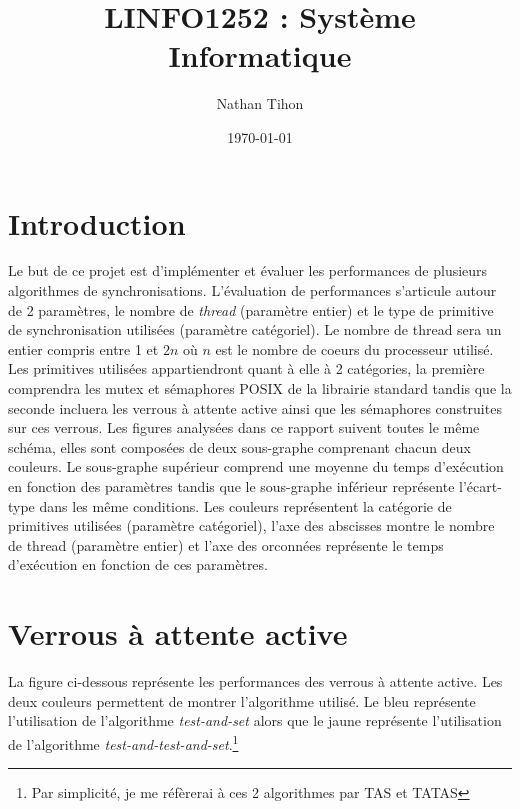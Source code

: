 

\title{LINFO1252 : Système Informatique}
\author{Nathan Tihon}
\date{\today}



\maketitle
\newpage

\section{Introduction}

Le but de ce projet est d'implémenter et évaluer les performances de plusieurs algorithmes de synchronisations.
L'évaluation de performances s'articule autour de 2 paramètres, le nombre de \textit{thread} (paramètre entier) et le type de primitive de synchronisation utilisées (paramètre catégoriel).
Le nombre de thread sera un entier compris entre 1 et $2n$ où $n$ est le nombre de coeurs du processeur utilisé.
Les primitives utilisées appartiendront quant à elle à 2 catégories, la première comprendra les mutex et sémaphores POSIX de la librairie standard tandis que la seconde incluera les verrous à attente active ainsi que les sémaphores construites sur ces verrous.
Les figures analysées dans ce rapport suivent toutes le même schéma, elles sont composées de deux sous-graphe comprenant chacun deux couleurs.
Le sous-graphe supérieur comprend une moyenne du temps d'exécution en fonction des paramètres tandis que le sous-graphe inférieur représente l'écart-type dans les même conditions.
Les couleurs représentent la catégorie de primitives utilisées (paramètre catégoriel), l'axe des abscisses montre le nombre de thread (paramètre entier) et l'axe des orconnées représente le temps d'exécution en fonction de ces paramètres.

\section{Verrous à attente active}

La figure ci-dessous représente les performances des verrous à attente active. 
Les deux couleurs permettent de montrer l'algorithme utilisé. 
Le bleu représente l'utilisation de l'algorithme \textit{test-and-set} alors que le jaune représente l'utilisation de l'algorithme \textit{test-and-test-and-set}.\footnote{Par simplicité, je me réfèrerai à ces 2 algorithmes par TAS et TATAS}

